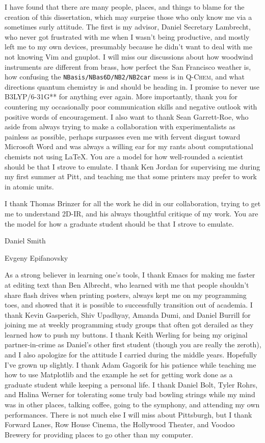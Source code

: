 \documentclass[%
  class = article,%
  crop = false,%
  float = true,%
  multi = true,%
  preview = false,%
]{standalone}
\begin{document}
I have found that there are many people, places, and things to blame for the creation of this dissertation, which may surprise those who only know me via a sometimes surly attitude. The first is my advisor, Daniel Secretary Lambrecht, who never got frustrated with me when I wasn't being productive, and mostly left me to my own devices, presumably because he didn't want to deal with me not knowing Vim and gnuplot. I will miss our discussions about how woodwind instruments are different from brass, how perfect the San Francisco weather is, how confusing the \texttt{NBasis/NBas6D/NB2/NB2car} mess is in \textsc{Q-Chem}, and what directions quantum chemistry is and should be heading in. I promise to never use B3LYP/6-31G** for anything ever again. More importantly, thank you for countering my occasionally poor communication skills and negative outlook with positive words of encouragement. I also want to thank Sean Garrett-Roe, who aside from always trying to make a collaboration with experimentalists as painless as possible, perhaps surpasses even me with fervent disgust toward Microsoft Word and was always a willing ear for my rants about computational chemists not using \LaTeX{}. You are a model for how well-rounded a scientist should be that I strove to emulate. I thank Ken Jordan for supervising me during my first summer at Pitt, and teaching me that some printers may prefer to work in atomic units.

I thank Thomas Brinzer for all the work he did in our collaboration, trying to get me to understand 2D-IR, and his always thoughtful critique of my work. You are the model for how a graduate student should be that I strove to emulate.

Daniel Smith

Evgeny Epifanovsky

As a strong believer in learning one's tools, I thank Emacs for making me faster at editing text than Ben Albrecht, who learned with me that people shouldn't share flash drives when printing posters, always kept me on my programming toes, and showed that it is possible to successfully transition out of academia. I thank Kevin Gasperich, Shiv Upadhyay, Amanda Dumi, and Daniel Burrill for joining me at weekly programming study groups that often got derailed as they learned how to push my buttons. I thank Keith Werling for being my original partner-in-crime as Daniel's other first student (though you are really the zeroth), and I also apologize for the attitude I carried during the middle years. Hopefully I've grown up slightly. I thank Adam Gagorik for his patience while teaching me how to use Matplotlib and the example he set for getting work done as a graduate student while keeping a personal life. I thank Daniel Bolt, Tyler Rohrs, and Halina Werner for tolerating some truly bad bowling strings while my mind was in other places, talking coffee, going to the symphony, and attending my own performances. There is not much else I will miss about Pittsburgh, but I thank Forward Lanes, Row House Cinema, the Hollywood Theater, and Voodoo Brewery for providing places to go other than my computer.
\end{document}
